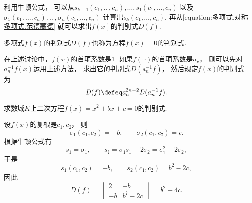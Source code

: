 利用牛顿公式，
可以从\(s_{k-1}(c_1,\dotsc,c_n),\dotsc,s_1(c_1,\dotsc,c_n)\)
以及\(\sigma_1(c_1,\dotsc,c_n),\dotsc,\sigma_n(c_1,\dotsc,c_n)\)
计算出\(s_k(c_1,\dotsc,c_n)\).
再从\cref{equation:多项式.对称多项式.范德蒙德}
就可以求出\(f(x)\)的判别式\(D(f)\).

多项式\(f(x)\)的判别式\(D(f)\)也称为方程\(f(x)=0\)的判别式.

\begin{remark}
在上述讨论中，\(f(x)\)的首项系数是1.
如果\(f(x)\)的首项系数是\(a_n\)，
则可以先对\(a_n^{-1} f(x)\)运用上述方法，
求出它的判别式\(D(a_n^{-1} f)\)，
然后规定\(f(x)\)的判别式为
\begin{equation}
	D(f)
	\defeq
	a_n^{2n-2} D(a_n^{-1} f).
\end{equation}
\end{remark}

\begin{example}
求数域\(K\)上二次方程\(f(x)=x^2+bx+c=0\)的判别式.
\begin{solution}
设\(f(x)\)的复根是\(c_1,c_2\)，
则\[
	\sigma_1(c_1,c_2)=-b, \qquad
	\sigma_2(c_1,c_2)=c.
\]
根据牛顿公式有\[
	s_1=\sigma_1, \qquad
	s_2=\sigma_1 s_1 - 2\sigma_2
	=\sigma_1^2-2\sigma_2,
\]
于是\[
	s_1(c_1,c_2)=-b, \qquad
	s_2(c_1,c_2)=b^2-2c,
\]
因此\[
	D(f)
	=\begin{vmatrix}
		2 & -b \\
		-b & b^2-2c
	\end{vmatrix}
	=b^2-4c.
\]
\end{solution}
\end{example}
